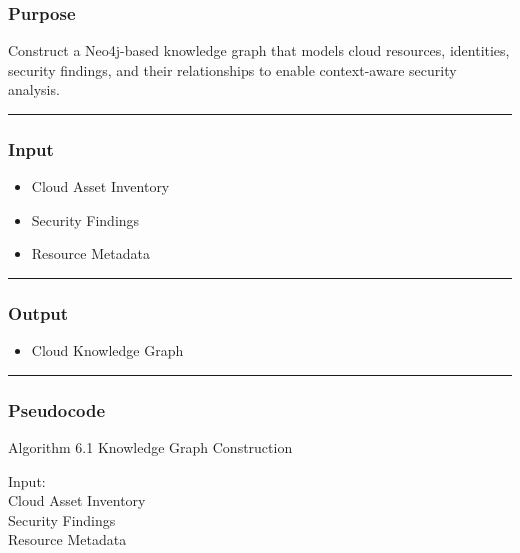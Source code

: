 \subsubsection{\texorpdfstring{\textbf{Purpose}}{Purpose}}

Construct a Neo4j-based knowledge graph that models cloud resources, identities, security findings, and their relationships to enable context-aware security analysis.

\begin{center}\rule{0.5\linewidth}{0.5pt}\end{center}

\subsubsection{\texorpdfstring{\textbf{Input}}{Input}}

\begin{itemize}
\tightlist
\item
  Cloud Asset Inventory\\
\item
  Security Findings\\
\item
  Resource Metadata
\end{itemize}

\begin{center}\rule{0.5\linewidth}{0.5pt}\end{center}

\subsubsection{\texorpdfstring{\textbf{Output}}{Output}}

\begin{itemize}
\tightlist
\item
  Cloud Knowledge Graph
\end{itemize}

\begin{center}\rule{0.5\linewidth}{0.5pt}\end{center}

\subsubsection{Pseudocode}

Algorithm 6.1 Knowledge Graph Construction

Input:\\
Cloud Asset Inventory\\
Security Findings\\
Resource Metadata

